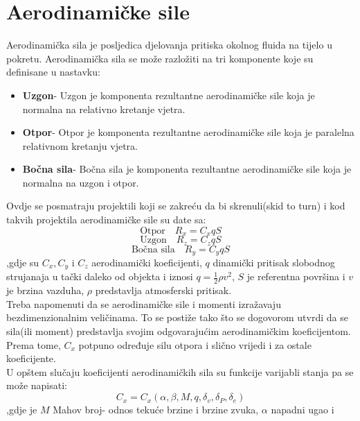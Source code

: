 \section{Aerodinamičke sile}
Aerodinamička sila je posljedica djelovanja pritiska okolnog fluida na tijelo u pokretu. 
Aerodinamička sila se može razložiti na tri komponente koje su definisane u nastavku:
\begin{itemize}
    \item \textbf{Uzgon}- Uzgon je komponenta rezultantne aerodinamičke sile 
    koja je normalna na relativno kretanje vjetra.
    \item \textbf{Otpor}- Otpor je komponenta rezultantne aerodinamičke sile 
    koja je paralelna relativnom kretanju vjetra.
    \item \textbf{Bočna sila}- Bočna sila je komponenta rezultantne aerodinamičke sile 
    koja je normalna na uzgon i otpor. 
\end{itemize}
Ovdje se posmatraju projektili koji se zakreću da bi skrenuli(skid to turn) i 
kod takvih projektila aerodinamičke sile su date sa:
\begin{equation}
   \text{Otpor} \quad R_x=C_xqS
   \label{eq:aa1}
\end{equation}
\begin{equation}
    \text{Uzgon} \quad R_z=C_zqS
    \label{eq:aa2}
\end{equation}
\begin{equation}
    \text{Bočna sila} \quad R_y=C_yqS
    \label{eq:aa3}
\end{equation}
,gdje su $C_x,C_y$ i $C_z$ aerodinamički koeficijenti, $q$ dinamički pritisak slobodnog strujanaja
u tački daleko od objekta i iznosi $q=\frac{1}{2}\rho v^2$, $S$ je referentna površina i 
$v$ je brzina vazduha, $\rho$ predstavlja atmosferski pritisak.\\
Treba napomenuti da se aerodinamičke sile i momenti izražavaju bezdimenzionalnim veličinama. 
To se postiže tako što se dogovorom utvrdi da se sila(ili moment) predstavlja svojim odgovarajućim 
aerodinamičkim koeficijentom. Prema tome, $C_x$ potpuno određuje silu otpora i slično vrijedi i 
za ostale koeficijente. \\
U opštem slučaju koeficijenti aerodinamičkih sila su funkcije varijabli stanja pa se može
napisati:
\begin{equation}
    C_x=C_x(\alpha ,\beta, M,q,\delta_v,\delta_P,\delta_e)
\end{equation}
,gdje je $M$ Mahov broj- odnos tekuće brzine i brzine zvuka, $\alpha$ napadni ugao i 
